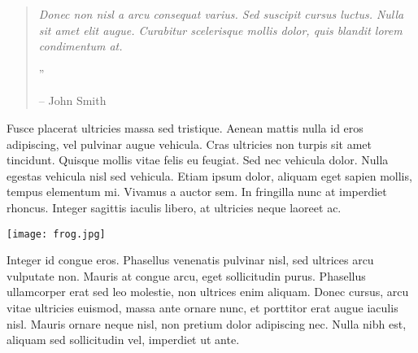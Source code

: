 \documentclass[10pt,a4paper]{article} %
\begin{document}
\begin{multicols}{3}
\begin{quotation} %

\noindent\normalsize\textit{Donec non nisl a arcu consequat varius. Sed suscipit cursus luctus. Nulla sit amet elit augue. Curabitur scelerisque mollis dolor, quis blandit lorem condimentum at.}

\hfill{\Huge''}

\hfill-- John Smith
\end{quotation}

Fusce placerat ultricies massa sed tristique. Aenean mattis nulla id eros adipiscing, vel pulvinar augue vehicula. Cras ultricies non turpis sit amet tincidunt. Quisque mollis vitae felis eu feugiat. Sed nec vehicula dolor. Nulla egestas vehicula nisl sed vehicula. Etiam ipsum dolor, aliquam eget sapien mollis, tempus elementum mi. Vivamus a auctor sem. In fringilla nunc at imperdiet rhoncus. Integer sagittis iaculis libero, at ultricies neque laoreet ac.

\begin{center}
\texttt{[image: frog.jpg]} %
\end{center}

Integer id congue eros. Phasellus venenatis pulvinar nisl, sed ultrices arcu vulputate non. Mauris at congue arcu, eget sollicitudin purus. Phasellus ullamcorper erat sed leo molestie, non ultrices enim aliquam. Donec cursus, arcu vitae ultricies euismod, massa ante ornare nunc, et porttitor erat augue iaculis nisl. Mauris ornare neque nisl, non pretium dolor adipiscing nec. Nulla nibh est, aliquam sed sollicitudin vel, imperdiet ut ante.

\end{multicols}

\end{document}
